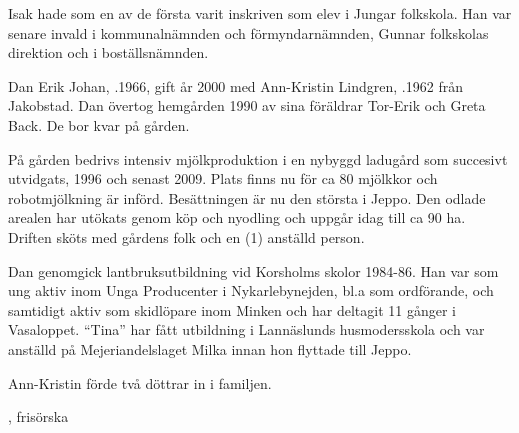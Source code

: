 Isak hade som en av de första varit inskriven som elev i Jungar folkskola. Han var senare invald i kommunalnämnden och förmyndarnämnden, Gunnar folkskolas direktion och i boställsnämnden.
\begin{jhchildren}
  \item {}
  \item {}
  \item {}
  \item {}
  \item {}
  \item {}
  \item {}
\end{jhchildren}




Dan Erik Johan, .1966, gift år 2000 med Ann-Kristin Lindgren, .1962 från Jakobstad. Dan övertog hemgården 1990 av sina  föräldrar Tor-Erik och Greta Back. De bor kvar på gården.

På gården bedrivs intensiv mjölkproduktion i en nybyggd ladugård som succesivt utvidgats, 1996 och senast 2009. Plats finns nu för ca 80 mjölkkor och robotmjölkning är införd. Besättningen är nu den största i Jeppo. Den odlade arealen har utökats genom köp och nyodling och uppgår idag till ca 90 ha. Driften sköts med gårdens folk och en (1) anställd person.

Dan genomgick lantbruksutbildning vid Korsholms skolor 1984-86. Han var som ung aktiv inom Unga Producenter i Nykarlebynejden, bl.a som ordförande, och samtidigt aktiv som skidlöpare inom Minken och har deltagit 11 gånger i Vasaloppet. ``Tina'' har fått utbildning i Lannäslunds husmodersskola och var anställd på Mejeriandelslaget Milka innan hon flyttade till Jeppo.

Ann-Kristin förde två döttrar in i familjen.
\begin{jhchildren}
  \item {}, frisörska
  \item {}
\end{jhchildren}


